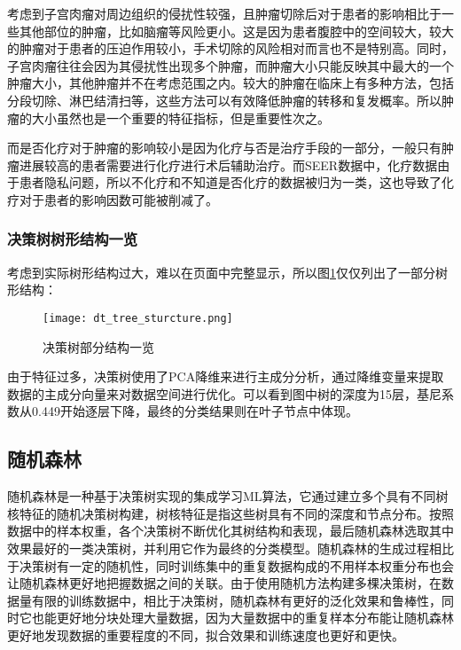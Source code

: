 考虑到子宫肉瘤对周边组织的侵扰性较强，且肿瘤切除后对于患者的影响相比于一些其他部位的肿瘤，比如脑瘤等风险更小。这是因为患者腹腔中的空间较大，较大的肿瘤对于患者的压迫作用较小，手术切除的风险相对而言也不是特别高。同时，子宫肉瘤往往会因为其侵扰性出现多个肿瘤，而肿瘤大小只能反映其中最大的一个肿瘤大小，其他肿瘤并不在考虑范围之内。较大的肿瘤在临床上有多种方法，包括分段切除、淋巴结清扫等，这些方法可以有效降低肿瘤的转移和复发概率。\cite{cabrera2021survival}所以肿瘤的大小虽然也是一个重要的特征指标，但是重要性次之。

而是否化疗对于肿瘤的影响较小是因为化疗与否是治疗手段的一部分，一般只有肿瘤进展较高的患者需要进行化疗进行术后辅助治疗。而SEER数据中，化疗数据由于患者隐私问题，所以不化疗和不知道是否化疗的数据被归为一类，这也导致了化疗对于患者的影响因数可能被削减了。

\subsubsection{决策树树形结构一览}

考虑到实际树形结构过大，难以在页面中完整显示，所以图\ref{fig:dt_tree_sturcture}仅仅列出了一部分树形结构：

\begin{figure}[!htbp]
    \centering
    \texttt{[image: dt\_tree\_sturcture.png]}
    \caption{决策树部分结构一览} \label{fig:dt_tree_sturcture}
\end{figure}

由于特征过多，决策树使用了PCA降维来进行主成分分析，通过降维变量来提取数据的主成分向量来对数据空间进行优化。可以看到图中树的深度为15层，基尼系数从0.449开始逐层下降，最终的分类结果则在叶子节点中体现。

\subsection{随机森林}

随机森林是一种基于决策树实现的集成学习ML算法，它通过建立多个具有不同树核特征的随机决策树构建，树核特征是指这些树具有不同的深度和节点分布。按照数据中的样本权重，各个决策树不断优化其树结构和表现，最后随机森林选取其中效果最好的一类决策树，并利用它作为最终的分类模型。随机森林的生成过程相比于决策树有一定的随机性，同时训练集中的重复数据构成的不用样本权重分布也会让随机森林更好地把握数据之间的关联。由于使用随机方法构建多棵决策树，在数据量有限的训练数据中，相比于决策树，随机森林有更好的泛化效果和鲁棒性，同时它也能更好地分块处理大量数据，因为大量数据中的重复样本分布能让随机森林更好地发现数据的重要程度的不同，拟合效果和训练速度也更好和更快。

